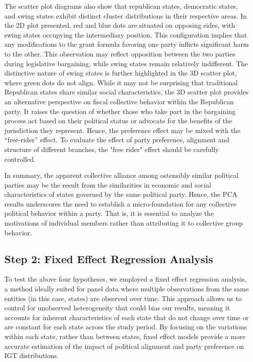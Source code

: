 The scatter plot diagrams also show that republican states, democratic states, and swing states exhibit distinct cluster distributions in their respective areas. In the 2D plot presented, red and blue dots are situated on opposing sides, with swing states occupying the intermediary position. This
configuration implies that any modifications to the grant formula favoring one party inflicts significant harm to the other. This observation may reflect opposition between the two parties during legislative bargaining, while swing states remain relatively indifferent. The distinctive nature of swing states is further highlighted in the 3D scatter plot, where green dots do not align. While it may not be surprising that traditional Republican states share similar social characteristics, the 3D scatter plot provides an alternative perspective on fiscal collective behavior within the Republican party. It raises the question of whether those who take part in the bargaining process act based on
their political status or advocate for the benefits of the jurisdiction they represent. Hence, the preference effect may be mixed with the “free-rider” effect. To evaluate the effect of party preference, alignment and structure of different branches, the "free rider" effect should be carefully controlled.

In summary, the apparent collective alliance among ostensibly similar political parties may be the result from the similarities in economic and social characteristics of states governed by the same political party. Hence, the PCA results underscores the need to establish a micro-foundation for any
collective political behavior within a party. That is, it is essential to analyze the motivations of individual members rather than attributing it to collective group behavior.

\subsection{Step 2: Fixed Effect Regression Analysis}

To test the above four hypotheses, we employed a fixed effect regression analysis, a method ideally suited for panel data where multiple observations from the same entities (in this case, states) are observed over time. This approach allows us to control for unobserved heterogeneity that could bias our results, meaning it accounts for inherent characteristics of each state that do not change over time or are constant for each state across the study period. By focusing on the variations within each state, rather than between states, fixed effect models provide a more accurate estimation of the impact of political alignment and party preference on IGT distributions.

